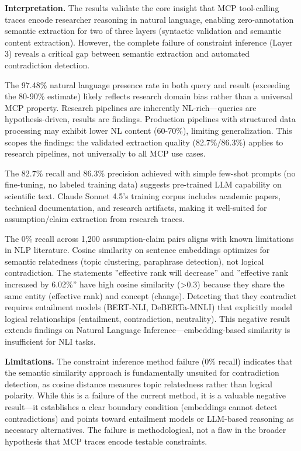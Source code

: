 
\textbf{Interpretation.} The results validate the core insight that MCP tool-calling traces encode researcher reasoning in natural language, enabling zero-annotation semantic extraction for two of three layers (syntactic validation and semantic content extraction). However, the complete failure of constraint inference (Layer 3) reveals a critical gap between semantic extraction and automated contradiction detection.

The 97.48\% natural language presence rate in both query and result (exceeding the 80-90\% estimate) likely reflects research domain bias rather than a universal MCP property. Research pipelines are inherently NL-rich---queries are hypothesis-driven, results are findings. Production pipelines with structured data processing may exhibit lower NL content (60-70\%), limiting generalization. This scopes the findings: the validated extraction quality (82.7\%/86.3\%) applies to research pipelines, not universally to all MCP use cases.

The 82.7\% recall and 86.3\% precision achieved with simple few-shot prompts (no fine-tuning, no labeled training data) suggests pre-trained LLM capability on scientific text. Claude Sonnet 4.5's training corpus includes academic papers, technical documentation, and research artifacts, making it well-suited for assumption/claim extraction from research traces.

The 0\% recall across 1,200 assumption-claim pairs aligns with known limitations in NLP literature. Cosine similarity on sentence embeddings optimizes for semantic relatedness (topic clustering, paraphrase detection), not logical contradiction. The statements ''effective rank will decrease'' and ''effective rank increased by 6.02\%'' have high cosine similarity (>0.3) because they share the same entity (effective rank) and concept (change). Detecting that they contradict requires entailment models (BERT-NLI, DeBERTa-MNLI) that explicitly model logical relationships (entailment, contradiction, neutrality). This negative result extends findings on Natural Language Inference---embedding-based similarity is insufficient for NLI tasks.

\textbf{Limitations.} The constraint inference method failure (0\% recall) indicates that the semantic similarity approach is fundamentally unsuited for contradiction detection, as cosine distance measures topic relatedness rather than logical polarity. While this is a failure of the current method, it is a valuable negative result---it establishes a clear boundary condition (embeddings cannot detect contradictions) and points toward entailment models or LLM-based reasoning as necessary alternatives. The failure is methodological, not a flaw in the broader hypothesis that MCP traces encode testable constraints.

